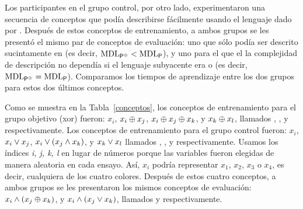 Los participantes en el grupo control, por otro lado, experimentaron una secuencia de conceptos que podía describirse fácilmente usando el lenguaje dado por \grambool. Después de estos conceptos de entrenamiento, a ambos grupos se les presentó el mismo par de conceptos de evaluación: uno que sólo podía ser descrito sucintamente en \gramboolxor (es decir, ${\rm MDL}_{{\sf P}^\oplus}<{\rm MDL}_{{\sf P}}$), y uno para el que el la complejidad de descripción no dependía si el lenguaje subyacente era \gramboolxor o \grambool (es decir, ${\rm MDL}_{{\sf P}^\oplus}={\rm MDL}_{{\sf P}}$). Comparamos los tiempos de aprendizaje entre los dos grupos para estos dos últimos conceptos.



Como se muestra en la Tabla~\ref{conceptos}, los conceptos de entrenamiento para el grupo objetivo (xor) fueron: $x_{i}$, $x_{i} \oplus x_{j}$, $x_{i} \oplus x_{j} \oplus x_{k}$, y $x_{k} \oplus x_{l}$, llamados \targeta, \targetb, \targetc y \targetd respectivamente. Los conceptos de entrenamiento para el grupo control fueron: $x_{i}$, $x_{i} \vee x_{j}$, $x_{i} \vee (x_{j} \wedge x_{k})$, y $x_{k} \vee x_{l}$ llamados \controla, \controlb, \controlc y \controld respectivamente. Usamos los índices \textit{i, j, k, l} en lugar de números porque las variables fueron elegidas de manera aleatoria en cada ensayo. Así, $x_{i}$ podría representar $x_1$, $x_2$, $x_3$ o $x_4$, es decir, cualquiera de los cuatro colores. Después de estos cuatro conceptos, a ambos grupos se les presentaron los mismos conceptos de evaluación: $x_{i} \wedge (x_{j} \oplus x_{k})$, y $x_{i} \wedge (x_{j} \vee x_{k})$, llamados \testa y \testb respectivamente.

